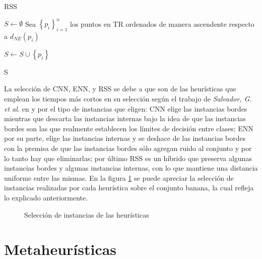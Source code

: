 \begin{algorithm}
\caption{RSS}
\label{rss}
\begin{algorithmic}[1]


\State $S \gets \emptyset$
\State Sea $\left\{p_i\right\}_{i=1}^n$ los puntos en TR ordenados de manera ascendente respecto a $d_{NE}(p_i)$

		\State $S \gets S \cup \left\{p_i\right\}$
	\EndIf
\EndFor

\State \Return S

\end{algorithmic}
\end{algorithm}


La selección de CNN, ENN, y RSS se debe a que son de las heurísticas que emplean los tiempos más cortos en su selección según el trabajo de \emph{Salvador, G. et al.} en \cite{garcia2012prototype} y por el tipo de instancias que eligen: CNN elige las instancias bordes mientras que descarta las instancias internas bajo la idea de que las instancias bordes son las que realmente establecen los límites de decisión entre clases; ENN por su parte, elige las instancias internas y se deshace de las instancias bordes con la premisa de que las instancias bordes sólo agregan ruido al conjunto y por lo tanto hay que eliminarlas; por último RSS es un híbrido que preserva algunas instancias bordes y algunas instancias internas, con lo que mantiene una distancia uniforme entre las mismas. En la figura \ref{heu2} se puede apreciar la selección de instancias realizadas por cada heurística sobre el conjunto banana, la cual refleja lo explicado anteriormente.

\begin{figure}[]

	\centering

\caption{Selección de instancias de las heurísticas}
\label{heu2}
\end{figure}


\section{Metaheurísticas}

